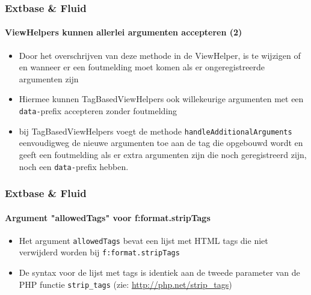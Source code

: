
\begin{frame}[fragile]
	\frametitle{Extbase \& Fluid}
	\framesubtitle{ViewHelpers kunnen allerlei argumenten accepteren (2)}

	\begin{itemize}

		\item Door het overschrijven van deze methode in de ViewHelper, is te wijzigen
		 	of en wanneer er een foutmelding moet komen als er ongeregistreerde
		 	argumenten zijn

		\item Hiermee kunnen TagBasedViewHelpers ook willekeurige argumenten met een
			\texttt{data-}prefix accepteren zonder foutmelding

		\item bij TagBasedViewHelpers voegt de methode \texttt{handleAdditionalArguments}
			eenvoudigweg de nieuwe argumenten toe aan de tag die opgebouwd wordt en geeft
			een foutmelding als er extra argumenten zijn die noch geregistreerd zijn,
			noch een \texttt{data-}prefix hebben.

	\end{itemize}

\end{frame}


\begin{frame}[fragile]
	\frametitle{Extbase \& Fluid}
	\framesubtitle{Argument "allowedTags" voor f:format.stripTags}

	\begin{itemize}

		\item Het argument \texttt{allowedTags} bevat een lijst met HTML tags
		 	die niet verwijderd worden bij \texttt{f:format.stripTags}

		\item De syntax voor de lijst met tags is identiek aan de tweede parameter
		 	van de PHP functie \texttt{strip\_tags} (zie: \url{http://php.net/strip_tags})

	\end{itemize}

\end{frame}

